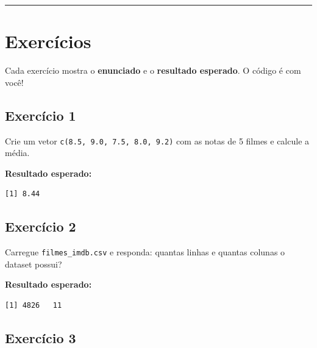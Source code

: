 \documentclass[
  letterpaper,
]{scrbook}
\begin{document}
\begin{center}\rule{0.5\linewidth}{0.5pt}\end{center}

\section{Exercícios}\label{exercuxedcios}

\begin{tcolorbox}[enhanced jigsaw, arc=.35mm, bottomrule=.15mm, bottomtitle=1mm, breakable, colback=white, colbacktitle=quarto-callout-note-color!10!white, colframe=quarto-callout-note-color-frame, coltitle=black, left=2mm, leftrule=.75mm, opacityback=0, opacitybacktitle=0.6, rightrule=.15mm, title=\textcolor{quarto-callout-note-color}{\faInfo}\hspace{0.5em}{Como fazer os exercícios}, titlerule=0mm, toprule=.15mm, toptitle=1mm]

Cada exercício mostra o \textbf{enunciado} e o \textbf{resultado
esperado}. O código é com você!

\end{tcolorbox}

\subsection{Exercício 1}\label{exercuxedcio-1}

Crie um vetor \texttt{c(8.5,\ 9.0,\ 7.5,\ 8.0,\ 9.2)} com as notas de 5
filmes e calcule a média.

\textbf{Resultado esperado:}

\begin{verbatim}
[1] 8.44
\end{verbatim}

\subsection{Exercício 2}\label{exercuxedcio-2}

Carregue \texttt{filmes\_imdb.csv} e responda: quantas linhas e quantas
colunas o dataset possui?

\textbf{Resultado esperado:}

\begin{verbatim}
[1] 4826   11
\end{verbatim}

\subsection{Exercício 3}\label{exercuxedcio-3}
\end{document}
